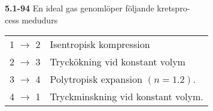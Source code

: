 \documentclass[twocolumn]{book}
\begin{document}
\bigskip
\noindent\textbf{5.1-94}\hfill\break
\noindent En ideal gas genomlöper följande kretspro-\\
cess medudurs
\begin{table}
\noindent\begin{tabular}{ l l  } 
1 $\rightarrow$ 2 & Isentropisk kompression\\
2 $\rightarrow$ 3 & Tryckökning vid konstant volym  \\ 
3 $\rightarrow$ 4 & Polytropisk expansion $(n=1.2)$.\\
4 $\rightarrow$ 1 & Tryckminskning vid konstant volym.\\                
\end{tabular}
\end{table}

\bigskip
\end{document}
